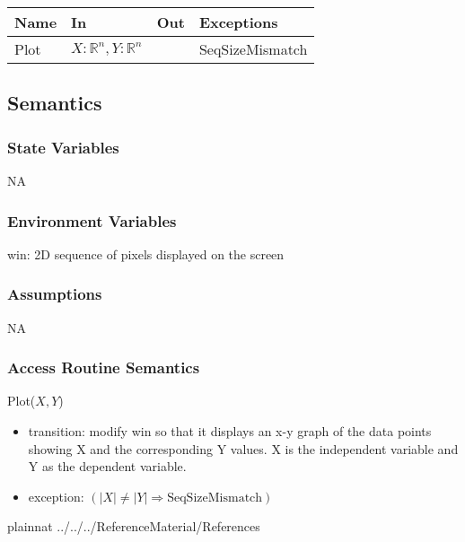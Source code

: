 \documentclass[12pt, titlepage]{article}
\begin{document}
\begin{center}
	\begin{tabular}{p{2cm} p{8cm} p{2cm} p{2cm}}
		\hline
		\textbf{Name} & \textbf{In} & \textbf{Out} & \textbf{Exceptions} \\
		\hline
		Plot & $X: \mathbb{R}^n, Y: \mathbb{R}^n$ & ~ & SeqSizeMismatch\\
		\hline
	\end{tabular}
\end{center}

\subsection{Semantics}

\subsubsection{State Variables}

NA

\subsubsection{Environment Variables}

win: 2D sequence of pixels displayed on the screen\\

\subsubsection{Assumptions}

NA

\subsubsection{Access Routine Semantics}

\noindent Plot($X, Y$)
\begin{itemize}
	\item transition: modify win so that it displays an x-y graph of the data 
	points showing X and the corresponding Y values.  X is the independent 
	variable and Y as the dependent variable.
	\item exception: $( |X| \neq |Y| \Rightarrow \mbox{SeqSizeMismatch})$
\end{itemize}

\newpage




 {plainnat}
 {../../../ReferenceMaterial/References}

\newpage




\end{document}
